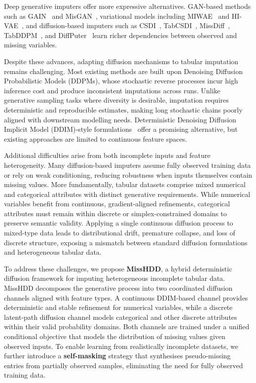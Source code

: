 \documentclass[times, review, 10pt]{elsarticle}
\newcommand{\DIFaddbegin}{\begingroup\color{blue}}
\newcommand{\DIFaddend}{\endgroup}
\begin{document}
\DIFaddbegin
Deep generative imputers offer more expressive alternatives. GAN-based methods such as GAIN~\cite{yoon2018gain} and MisGAN~\cite{misGAN}, variational models including MIWAE~\cite{mattei2019miwae} and HI-VAE~\cite{hivae}, and diffusion-based imputers such as CSDI~\cite{csdi}, TabCSDI~\cite{tabcsdi}, MissDiff~\cite{missdiff}, TabDDPM~\cite{tabddpm}, and DiffPuter~\cite{diffputer} learn richer dependencies between observed and missing variables.
\DIFaddend

Despite these advances, adapting diffusion mechanisms to tabular imputation remains challenging. Most existing methods are built upon Denoising Diffusion Probabilistic Models (DDPMs), whose stochastic reverse processes incur high inference cost and produce inconsistent imputations across runs. Unlike generative sampling tasks where diversity is desirable, imputation requires deterministic and reproducible estimates, making long stochastic chains poorly aligned with downstream modelling needs. Deterministic Denoising Diffusion Implicit Model (DDIM)-style formulations~\cite{ddim,missddim} offer a promising alternative, but existing approaches are limited to continuous feature spaces.

Additional difficulties arise from both incomplete inputs and feature heterogeneity. Many diffusion-based imputers assume fully observed training data or rely on weak conditioning, reducing robustness when inputs themselves contain missing values. More fundamentally, tabular datasets comprise mixed numerical and categorical attributes with distinct generative requirements. While numerical variables benefit from continuous, gradient-aligned refinements, categorical attributes must remain within discrete or simplex-constrained domains to preserve semantic validity. Applying a single continuous diffusion process to mixed-type data leads to distributional drift, premature collapse, and loss of discrete structure, exposing a mismatch between standard diffusion formulations and heterogeneous tabular data.

To address these challenges, we propose \textbf{MissHDD}, a hybrid deterministic diffusion framework for imputing heterogeneous incomplete tabular data. MissHDD decomposes the generative process into two coordinated diffusion channels aligned with feature types. A continuous DDIM-based channel provides deterministic and stable refinement for numerical variables, while a discrete latent-path diffusion channel models categorical and other discrete attributes within their valid probability domains. Both channels are trained under a unified conditional objective that models the distribution of missing values given observed inputs. To enable learning from realistically incomplete datasets, we further introduce a \textbf{self-masking} strategy that synthesises pseudo-missing entries from partially observed samples, eliminating the need for fully observed training data.
\end{document}
